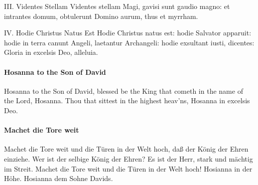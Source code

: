 \documentclass[11pt, ngermanm, titlepage]{article}
\begin{document}
\begin{multicols}{2}
	III. Videntes Stellam\newline
	Videntes stellam Magi,\newline
	gavisi sunt gaudio magno:\newline
	et intrantes domum,\newline
	obtulerunt Domino aurum, thus et myrrham.\newline
	
	IV. Hodie Christus Natus Est\newline
	Hodie Christus natus est:\newline
	hodie Salvator apparuit:\newline
	hodie in terra canunt Angeli,\newline
	laetantur Archangeli:\newline
	hodie exsultant iusti, dicentes:\newline
	Gloria in excelsis Deo, alleluia.\newline
	
	\paragraph{Hosanna to the Son of David\newline}
	Hosanna to the Son of David,\newline
	blessed be the King that cometh\newline
	in the name of the Lord, Hosanna.\newline
	Thou that sittest in the highest heav’ns,\newline
	Hosanna in excelsis Deo.
	
	\paragraph{Machet die Tore weit\newline}
	Machet die Tore weit\newline
	und die Türen in der Welt hoch,\newline
	daß der König der Ehren einziehe.\newline
	Wer ist der selbige König der Ehren?\newline
	Es ist der Herr,\newline
	stark und mächtig im Streit.\newline
	Machet die Tore weit\newline
	und die Türen in der Welt hoch!\newline
	Hosianna in der Höhe.\newline
	Hosianna dem Sohne Davids.
	

\end{multicols}
\end{document}
